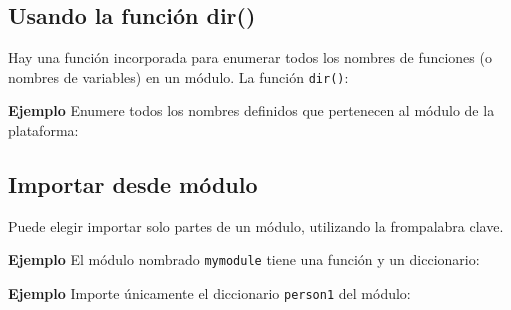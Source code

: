 \subsection{Usando la función dir()}\label{usando-la-funciuxf3n-dir}

Hay una función incorporada para enumerar todos los nombres de funciones
(o nombres de variables) en un módulo. La función \texttt{dir()}:

\textbf{Ejemplo} Enumere todos los nombres definidos que pertenecen al
módulo de la plataforma:

\begin{Shaded}
\begin{Highlighting}[]

\OperatorTok{=} 
\end{Highlighting}
\end{Shaded}

\subsection{Importar desde módulo}\label{importar-desde-muxf3dulo}

Puede elegir importar solo partes de un módulo, utilizando la
frompalabra clave.

\textbf{Ejemplo} El módulo nombrado \texttt{mymodule} tiene una función
y un diccionario:

\begin{Shaded}
\begin{Highlighting}[]
    \NormalTok{(} \OperatorTok{+}

\OperatorTok{=}\NormalTok{ \{}
    \NormalTok{: }\NormalTok{,}
    \NormalTok{: }\NormalTok{,}
    \NormalTok{: }
\NormalTok{\}}
\end{Highlighting}
\end{Shaded}

\textbf{Ejemplo} Importe únicamente el diccionario \texttt{person1} del
módulo:

\begin{Shaded}
\begin{Highlighting}[]

\NormalTok{ (person1[}\NormalTok{])}
\end{Highlighting}
\end{Shaded}

